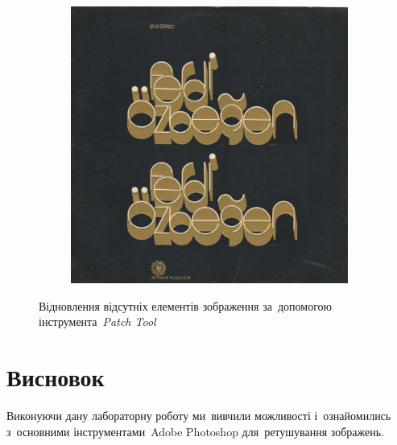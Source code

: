 \documentclass[
	a4paper,
	oneside,
	BCOR = 10mm,
	DIV = 12,
	12pt,
	headings = normal,
]{scrartcl}
\begin{document}
\begin{figure}[!htbp]
\begin{subfigure}{0.5\textwidth}
						\includegraphics[height = 6\baselineskip]{./../01-solution/y03s01-multimedia-lab-02-01-p04-patch-tool.jpg}
						\caption{}
						\label{subfig:04-02-res}
					\end{subfigure}
					\caption{Відновлення відсутніх елементів зображення за~допомогою інструмента~\emph{\textenglish{Patch Tool}}}
					\label{fig:04-addition-patch-tool}
				\end{figure}

	\section{Висновок}
		Виконуючи дану лабораторну роботу ми~вивчили можливості і~ознайомились з~основними інструментами~\textenglish{Adobe Photoshop} для~ретушування зображень.
\end{document}
